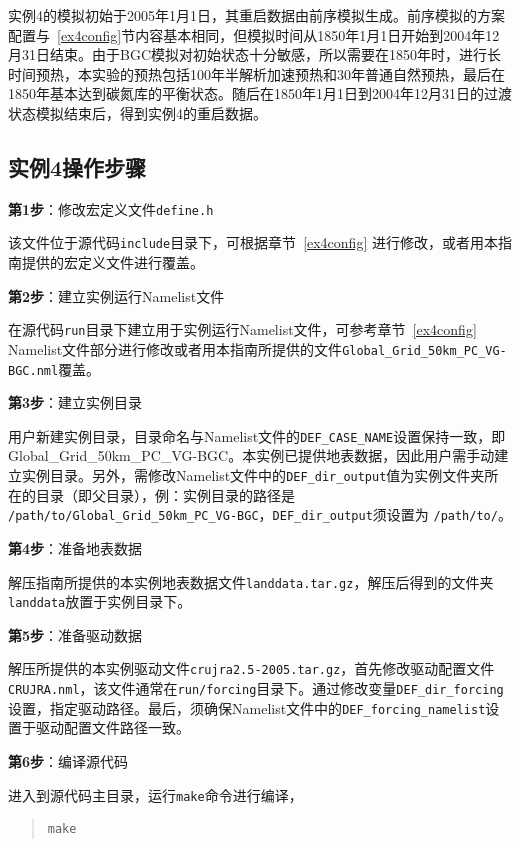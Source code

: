 实例4的模拟初始于2005年1月1日，其重启数据由前序模拟生成。前序模拟的方案配置与~\ref{ex4config}节内容基本相同，但模拟时间从1850年1月1日开始到2004年12月31日结束。由于BGC模拟对初始状态十分敏感，所以需要在1850年时，进行长时间预热，本实验的预热包括100年半解析加速预热和30年普通自然预热，最后在1850年基本达到碳氮库的平衡状态。随后在1850年1月1日到2004年12月31日的过渡状态模拟结束后，得到实例4的重启数据。

\subsection{实例4操作步骤}

\textbf{第1步}：修改宏定义文件\texttt{define.h}

该文件位于源代码\texttt{include}目录下，可根据章节~\ref{ex4config} 进行修改，或者用本指南提供的宏定义文件进行覆盖。

\bigskip
\textbf{第2步}：建立实例运行Namelist文件

在源代码\texttt{run}目录下建立用于实例运行Namelist文件，可参考章节~\ref{ex4config} Namelist文件部分进行修改或者用本指南所提供的文件\texttt{Global\_Grid\_50km\_PC\_VG-BGC.nml}覆盖。

\bigskip
\textbf{第3步}：建立实例目录

用户新建实例目录，目录命名与Namelist文件的\texttt{DEF\_CASE\_NAME}设置保持一致，即Global\_Grid\_50km\_PC\_VG-BGC。本实例已提供地表数据，因此用户需手动建立实例目录。另外，需修改Namelist文件中的\texttt{DEF\_dir\_output}值为实例文件夹所在的目录（即父目录），例：实例目录的路径是 \texttt{/path/to/Global\_Grid\_50km\_PC\_VG-BGC}，\texttt{DEF\_dir\_output}须设置为 \texttt{/path/to/}。

\bigskip
\textbf{第4步}：准备地表数据

解压指南所提供的本实例地表数据文件\texttt{landdata.tar.gz}，解压后得到的文件夹\texttt{landdata}放置于实例目录下。

\bigskip
\textbf{第5步}：准备驱动数据

解压所提供的本实例驱动文件\texttt{crujra2.5-2005.tar.gz}，首先修改驱动配置文件\texttt{CRUJRA.nml}，该文件通常在\texttt{run/forcing}目录下。通过修改变量\texttt{DEF\_dir\_forcing}设置，指定驱动路径。最后，须确保Namelist文件中的\texttt{DEF\_forcing\_namelist}设置于驱动配置文件路径一致。

\bigskip
\textbf{第6步}：编译源代码

进入到源代码主目录，运行\texttt{make}命令进行编译，
\begin{quote}
\begin{lstlisting}
make
\end{lstlisting}
\end{quote}

